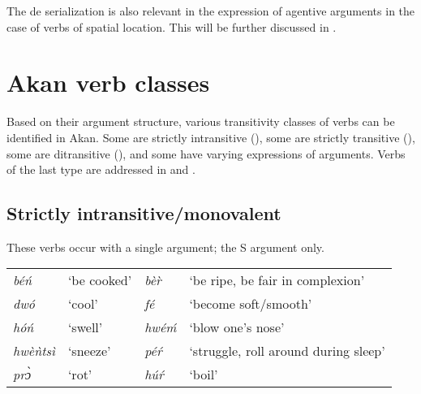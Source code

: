 \documentclass[output=paper]{langsci/langscibook}
\begin{document}
The de serialization is also relevant in the expression of agentive arguments in the case of verbs of spatial location. This will be further discussed in .

\section{Akan verb classes}\label{§3:akan.osam}

Based on their argument structure, various transitivity classes of verbs can be identified in Akan. Some are strictly intransitive (), some are strictly transitive (), some are ditransitive (), and some have varying expressions of arguments. Verbs of the last type are addressed in  and .

\subsection{Strictly intransitive/monovalent}\label{§3.1:strictly.osam}

These verbs occur with a single argument; the S argument only.

\ea
\label{ex:22.osam}
\begin{table}
\begin{tabular}{llll}
\textit{béń} & ‘be cooked’ & \textit{bèr̀} & ‘be ripe, be fair in complexion’ \\
\textit{dwó} & `cool' & \textit{fé} & `become soft/smooth'  \\
\textit{hóń} & `swell' & \textit{hwéḿ} & `blow one's nose' \\
\textit{hwèǹtsì} & `sneeze' & \textit{péŕ} & `struggle, roll around during sleep'\\
\textit{prɔ̀} & `rot' & \textit{húŕ} & `boil' \\
\end{tabular}
\end{table}
\z



\ea
\label{ex:23.osam}
	\z

	\z
\z
\end{document}
